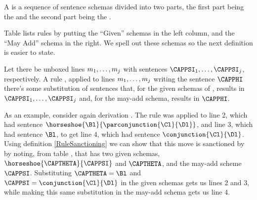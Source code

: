 \begin{majorILnc}{}
	A  is a sequence of sentence schemas divided into two parts, the first part being the  and the second part being the . 
\end{majorILnc}
\noindent{}Table  lists rules by putting the ``Given'' schemas in the left column, and the ``May Add'' schema in the right. 
We spell out these schemas so the next definition is easier to state.
\begin{majorILnc}{}
	Let there be unboxed lines $m_1,\ldots,m_{j}$ with sentences $\CAPPSI_1,\ldots,\CAPPSI_{\integer{j}}$, respectively.
	A rule , applied to lines $m_1,\ldots,m_{j}$  writing the sentence $\CAPPHI$ \Iff there's some substitution of \GSL{} sentences that, for the given schemas of , results in $\CAPPSI_1,\ldots,\CAPPSI_{\integer{j}}$ and, for the may-add schema, results in $\CAPPHI$. 
\end{majorILnc}
\noindent{}As an example, consider again derivation . 
The rule  was applied to line 2, which had sentence $\horseshoe{\Bl}{\parconjunction{\Cl}{\Dl}}$, and line 3, which had sentence $\Bl$, to get line 4, which had sentence $\conjunction{\Cl}{\Dl}$. 
Using definition \ref{RuleSanctioning} we can show that this move is sanctioned by  by noting, from table , that  has two given schemas, $\horseshoe{\CAPTHETA}{\CAPPSI}$ and $\CAPTHETA$, and the may-add scheme $\CAPPSI$. 
Substituting $\CAPTHETA=\Bl$ and $\CAPPSI=\conjunction{\Cl}{\Dl}$ in the given schemas gets us lines 2 and 3, while making this same substitution in the may-add schema gets us line 4. 

